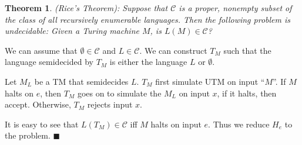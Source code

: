 \documentclass[aps,pra,onecolumn,notitlepage,superscriptaddress]{revtex4-1}
\newtheorem{theo}{Theorem}
\def\qed{$\blacksquare$ \newline}
\begin{document}
    \begin{theo}
        (Rice's Theorem): Suppose that $\mathcal C$ is a proper, nonempty subset of the class of all recursively enumerable languages. Then the following problem is undecidable: Given a Turing machine $M$, is $L(M) \in \mathcal C$?    
    \end{theo}

    We can assume that $\emptyset \in \mathcal C$ and $L \in \mathcal C$. We can construct $T_M$ such that the language semidecided by $T_M$ is either the language $L$ or $\emptyset$.

    Let $M_L$ be a TM that semidecides $L$. $T_M$ first simulate UTM on input ``$M$''. If $M$ halts on $e$, then $T_M$ goes on to simulate the $M_L$ on input $x$, if it halts, then accept. Otherwise, $T_M$ rejects input $x$.

    It is easy to see that $L(T_M) \in \mathcal C$ iff $M$ halts on input $e$. Thus we reduce $H_e$ to the problem. \qed
    
\end{document}
